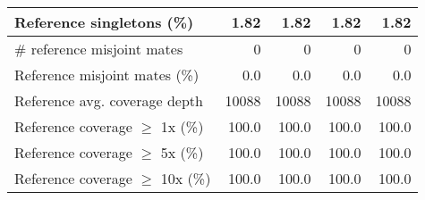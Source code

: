 \documentclass[12pt,a4paper]{article}
\begin{document}
\begin{table}[ht]
\begin{center}
\begin{tabular}{|l*{4}{|r}|}
Reference singletons (\%) & 1.82 & 1.82 & 1.82 & 1.82 \\ \hline
\# reference misjoint mates & 0 & 0 & 0 & 0 \\ \hline
Reference misjoint mates (\%) & 0.0 & 0.0 & 0.0 & 0.0 \\ \hline
Reference avg. coverage depth & 10088 & 10088 & 10088 & 10088 \\ \hline
Reference coverage $\geq$ 1x (\%) & 100.0 & 100.0 & 100.0 & 100.0 \\ \hline
Reference coverage $\geq$ 5x (\%) & 100.0 & 100.0 & 100.0 & 100.0 \\ \hline
Reference coverage $\geq$ 10x (\%) & 100.0 & 100.0 & 100.0 & 100.0 \\ \hline
\end{tabular}
\end{center}
\end{table}
\end{document}
